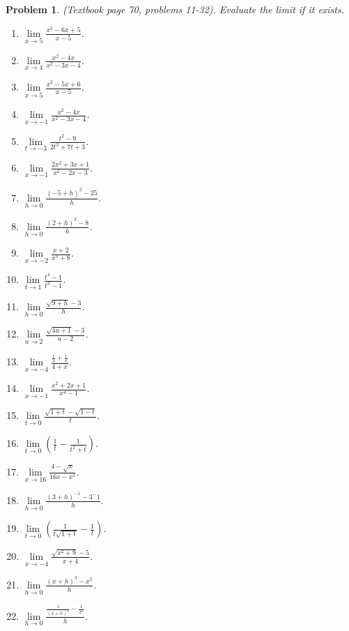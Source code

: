 \documentclass{article}
\newtheorem{problem}{Problem}
\begin{document}
\begin{problem}(Textbook page 70, problems 11-32). 
Evaluate the limit if it exists.
\begin{multicols}{2}
\begin{enumerate}
\item $\displaystyle\lim\limits_{x\to 5}\frac{x^2-6x+5}{x-5} $.
\item $\displaystyle\lim\limits_{x\to 4}\frac{x^2-4x}{x^2-3x-4} $.
\item $\displaystyle\lim\limits_{x\to 5}\frac{x^2-5x+6}{x-5} $.
\item $\displaystyle\lim\limits_{x\to -1}\frac{x^2-4x}{x^{2}-3x-4} $.
\item $\displaystyle\lim\limits_{t\to -3}\frac{t^2-9}{2t^2+7t+3} $.
\item $\displaystyle\lim\limits_{x\to -1}\frac{2x^2+3x+1}{x^2-2x-3} $.
\item $\displaystyle\lim\limits_{h\to 0}\frac{(-5+h)^2-25}{h} $.
\item $\displaystyle\lim\limits_{h\to 0}\frac{(2+h)^3-8}{h} $.
\item $\displaystyle\lim\limits_{x\to -2}\frac{x+2}{x^3+8} $.
\item $\displaystyle\lim\limits_{t\to 1}\frac{t^4-1}{t^3-1} $.
\item $\displaystyle\lim\limits_{h\to 0}\frac{\sqrt{9+h}-3}{h} $.
\item $\displaystyle\lim\limits_{u\to 2} \frac{\sqrt{4u+1}-3}{u-2}$.
\item $\displaystyle\lim\limits_{x\to -4} \frac{\frac{1}{4}+ \frac{1}{x}} {4+x}$.
\item $\displaystyle\lim\limits_{x\to -1} \frac{x^2+2x+1}{x^4-1}$.
\item $\displaystyle\lim\limits_{t\to 0} \frac{\sqrt{1+t}- \sqrt{1-t}}{t}$.
\item $\displaystyle\lim\limits_{t\to 0}\left(\frac{1}t -\frac{1}{t^2+t}\right)$.
\item $\displaystyle\lim\limits_{x\to 16} \frac{4-\sqrt{x}}{16x-x^2}$.
\item $\displaystyle\lim\limits_{h \to 0}\frac{(3+h)^{-1}-3^-1}{h} $.
\item $\displaystyle\lim\limits_{t\to 0} \left(\frac{1}{t\sqrt{1+t}}-\frac{1}{t} \right)$.
\item $\displaystyle\lim\limits_{x\to -4} \frac{\sqrt{x^2+9}-5}{x+4}$.
\item $\displaystyle\lim\limits_{h\to 0}\frac{(x+h)^3-x^3}{h} $.
\item $\displaystyle\lim\limits_{h\to 0}\frac{\frac{1}{(x+h)^2}-\frac{1}{x^2}}{h} $.
\end{enumerate}
\end{multicols}
\end{problem}
\end{document}
